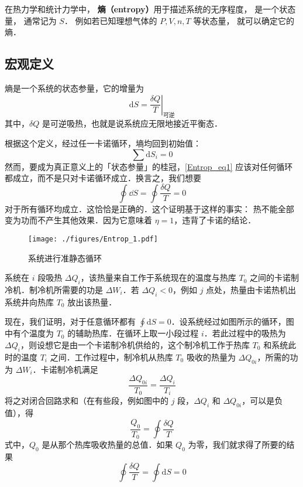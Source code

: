 
在热力学和统计力学中， \textbf{熵（entropy）}用于描述系统的无序程度， 是一个状态量， 通常记为 $S$． 例如若已知理想气体的 $P, V, n, T$ 等状态量， 就可以确定它的熵． %

\subsection{宏观定义}

熵是一个系统的状态参量，它的增量为
\begin{equation}
\mathrm{d} S = \left . \frac{\delta Q}{T}\right |_{\text{可逆}}
\end{equation}
其中，$\delta Q$ 是可逆吸热，也就是说系统应无限地接近平衡态．

根据这个定义，经过任一卡诺循环，墒均回到初始值：
\begin{equation} \label{Entrop_eq1}
\sum{\text{d}S_i=0}
\end{equation}
然而，要成为真正意义上的「状态参量」的桂冠，\autoref{Entrop_eq1} 应该对任何循环都成立，而不是只对卡诺循环成立．换言之，我们想要
\begin{equation}
\oint \dd S =\oint \frac{\delta Q}{T}=0
\end{equation}
对于所有循环均成立．这恰恰是正确的．这个证明基于这样的事实： 热不能全部变为功而不产生其他效果．因为它意味着 $\eta=1$，违背了卡诺的结论．

\begin{figure}[ht]
\centering
\texttt{[image: ./figures/Entrop\_1.pdf]}
\caption{系统进行准静态循环} \label{Entrop_fig1}
\end{figure}

系统在 $i$ 段吸热 $\Delta Q_i$，该热量来自工作于系统现在的温度与热库 $T_0$ 之间的卡诺制冷机．制冷机所需要的功是 $\Delta W_i$．若 $\Delta Q_i<0$，例如 $j$ 点处，热量由卡诺热机出系统井向热库 $T_0$ 放出该热量．

现在，我们证明，对于任意循环都有 $\oint \mathrm d S =0 $．设系统经过如图所示的循环，图中有个温度为 $T_0$ 的辅助热库．在循环上取一小段过程 $i$．若此过程中的吸热为 $\Delta Q_i$，则设想它是由一个卡诺制冷机供给的，这个制冷机工作于热库 $T_0$ 和系统此时的温度 $T_i$ 之间．工作过程中，制冷机从热库 $T_0$ 吸收的热量为 $\Delta Q_{0i}$，所需的功为 $\Delta W_i$．卡诺制冷机满足
\begin{equation}
\frac{\Delta Q_{0i}}{T_0}=\frac{\Delta Q_i}{T_i}
\end{equation}
将之对闭合回路求和（在有些段，例如图中的 $j$ 段，$\Delta Q_i$ 和 $\Delta Q_{0i}$，可以是负值），得
\begin{equation}
\frac{Q_0}{T_0}=\oint{\frac{\delta Q}{T}}
\end{equation}
式中，$Q_0$ 是从那个热库吸收热量的总值．如果 $Q_0$ 为零，我们就求得了所要的结果
\begin{equation}
\oint{\frac{\delta Q}{T}=\oint{\text{d}S=0}}
\end{equation}

